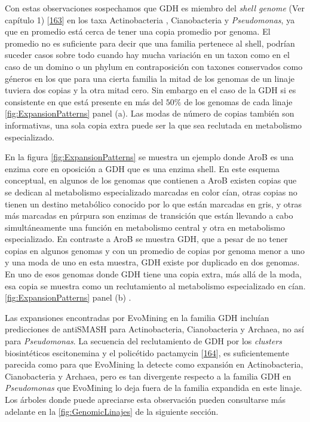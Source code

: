 \documentclass[12pt,twoside]{reedthesis}
\begin{document}
  Con estas observaciones sospechamos que GDH es miembro del \emph{shell
  genome} (Ver capítulo 1)
  {[}\protect\hyperlink{ref-koonin_genomics_2008}{163}{]} en los taxa
  Actinobacteria , Cianobacteria y \emph{Pseudomonas}, ya que en promedio
  está cerca de tener una copia promedio por genoma. El promedio no es
  suficiente para decir que una familia pertenece al shell, podrían
  suceder casos sobre todo cuando hay mucha variación en un taxon como en
  el caso de un domino o un phylum en contraposición con taxones
  conservados como géneros en los que para una cierta familia la mitad de
  los genomas de un linaje tuviera dos copias y la otra mitad cero. Sin
  embargo en el caso de la GDH si es consistente en que está presente en
  más del \(50\%\) de los genomas de cada linaje
  \autoref{fig:ExpansionPatterns} panel (a). Las modas de número de copias
  también son informativas, una sola copia extra puede ser la que sea
  reclutada en metabolismo especializado.
  
  En la figura \autoref{fig:ExpansionPatterns} se muestra un ejemplo donde
  AroB es una enzima core en oposición a GDH que es una enzima shell. En
  este esquema conceptual, en algunos de los genomas que contienen a AroB
  existen copias que se dedican al metabolismo especializado marcadas en
  color cían, otras copias no tienen un destino metabólico conocido por lo
  que están marcadas en gris, y otras más marcadas en púrpura son enzimas
  de transición que están llevando a cabo simultáneamente una función en
  metabolismo central y otra en metabolismo especializado. En contraste a
  AroB se muestra GDH, que a pesar de no tener copias en algunos genomas y
  con un promedio de copias por genoma menor a uno y una moda de uno en
  esta muestra, GDH existe por duplicado en dos genomas. En uno de esos
  genomas donde GDH tiene una copia extra, más allá de la moda, esa copia
  se muestra como un reclutamiento al metabolismo especializado en cían.
  \autoref{fig:ExpansionPatterns} panel (b) .
  
  Las expansiones encontradas por EvoMining en la familia GDH incluían
  predicciones de antiSMASH para Actinobacteria, Cianobacteria y Archaea,
  no así para \emph{Pseudomonas}. La secuencia del reclutamiento de GDH
  por los \emph{clusters} biosintéticos escitonemina y el policétido
  pactamycin {[}\protect\hyperlink{ref-kudo_cloning_2007}{164}{]}, es
  suficientemente parecida como para que EvoMining la detecte como
  expansión en Actinobacteria, Cianobacteria y Archaea, pero es tan
  divergente respecto a la familia GDH en \emph{Pseudomonas} que EvoMining
  lo deja fuera de la familia expandida en este linaje. Los árboles donde
  puede apreciarse esta observación pueden consultarse más adelante en la
  \autoref{fig:GenomicLinajes} de la siguiente sección.
  
\end{document}
